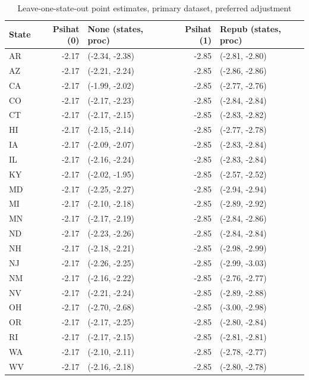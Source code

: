 \begin{table}[ht]
\centering
   \caption{Leave-one-state-out point estimates, primary dataset, preferred adjustment}
    \label{tab:loostatec1}
\begin{tabular}{lrlrl}
  \hline
State & Psihat (0) & None (states, proc) & Psihat (1) & Repub (states, proc) \\ 
  \hline
AR & -2.17 & (-2.34, -2.38) & -2.85 & (-2.81, -2.80) \\ 
  AZ & -2.17 & (-2.21, -2.24) & -2.85 & (-2.86, -2.86) \\ 
  CA & -2.17 & (-1.99, -2.02) & -2.85 & (-2.77, -2.76) \\ 
  CO & -2.17 & (-2.17, -2.23) & -2.85 & (-2.84, -2.84) \\ 
  CT & -2.17 & (-2.17, -2.15) & -2.85 & (-2.83, -2.82) \\ 
  HI & -2.17 & (-2.15, -2.14) & -2.85 & (-2.77, -2.78) \\ 
  IA & -2.17 & (-2.09, -2.07) & -2.85 & (-2.83, -2.84) \\ 
  IL & -2.17 & (-2.16, -2.24) & -2.85 & (-2.83, -2.84) \\ 
  KY & -2.17 & (-2.02, -1.95) & -2.85 & (-2.57, -2.52) \\ 
  MD & -2.17 & (-2.25, -2.27) & -2.85 & (-2.94, -2.94) \\ 
  MI & -2.17 & (-2.10, -2.18) & -2.85 & (-2.89, -2.92) \\ 
  MN & -2.17 & (-2.17, -2.19) & -2.85 & (-2.84, -2.86) \\ 
  ND & -2.17 & (-2.23, -2.26) & -2.85 & (-2.84, -2.84) \\ 
  NH & -2.17 & (-2.18, -2.21) & -2.85 & (-2.98, -2.99) \\ 
  NJ & -2.17 & (-2.26, -2.25) & -2.85 & (-2.99, -3.03) \\ 
  NM & -2.17 & (-2.16, -2.22) & -2.85 & (-2.76, -2.77) \\ 
  NV & -2.17 & (-2.21, -2.24) & -2.85 & (-2.89, -2.88) \\ 
  OH & -2.17 & (-2.70, -2.68) & -2.85 & (-3.00, -2.98) \\ 
  OR & -2.17 & (-2.17, -2.25) & -2.85 & (-2.80, -2.84) \\ 
  RI & -2.17 & (-2.17, -2.15) & -2.85 & (-2.81, -2.81) \\ 
  WA & -2.17 & (-2.10, -2.11) & -2.85 & (-2.78, -2.77) \\ 
  WV & -2.17 & (-2.16, -2.18) & -2.85 & (-2.80, -2.78) \\ 
   \hline
\end{tabular}
\end{table}

